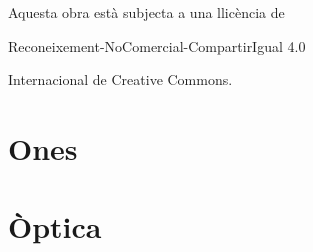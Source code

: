 \documentclass[paper=a4, fontsize=13pt, twoside=semi]{scrartcl}
\title{
    \normalfont
    \small \scshape{\myuni} \\ [25pt] 
    \horrule{0.5pt} \\[0.4cm]
    \huge \mytitle \\
    \horrule{2pt} \\[0.5cm]
}
\author{\myauthor}
\date{\mydate}
\numberwithin{equation}{section}
\numberwithin{figure}{section}
\numberwithin{table}{section}
\begin{document}
\clearpage\maketitle
\thispagestyle{empty}
\addtocounter{page}{-1}

\section*{}\thispagestyle{empty}
\begin{centering}
    \huge \ccbyncsaeu
    
    \normalsize Aquesta obra està subjecta a una llicència de 
    
    Reconeixement-NoComercial-CompartirIgual 4.0 
    
    Internacional de Creative Commons.
    
\end{centering}

\tableofcontents

\part*{Ones}
    
    

\part*{Òptica}
    
    
    
    

\end{document}
